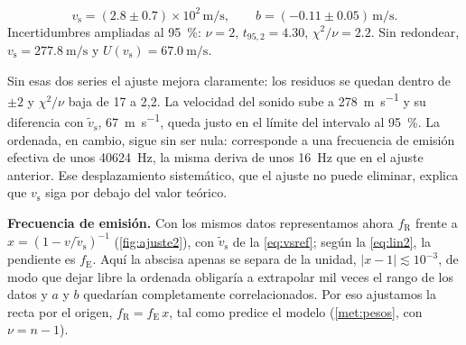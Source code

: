 \documentclass[a4paper,11pt]{amsart}
\numberwithin{equation}{section}
\newcommand{\vs}{v_{\mathrm{s}}}              %
\newcommand{\vst}{\tilde{v}_{\mathrm{s}}}     %
\newcommand{\fE}{f_{\mathrm{E}}}              %
\newcommand{\fR}{f_{\mathrm{R}}}              %
\newcommand{\ext}[1]{U(#1)}                   %
\theoremstyle{cienplano}
\theoremstyle{ciendef}
\theoremstyle{cienobs}
\begin{document}
\begin{destacado}
\vspace{-4pt}
\begin{equation}\label{eq:vsajusteb}
  \vs=(\num{2,8}\pm\num{0,7})\times10^{2}\,\si{\meter\per\second},\qquad
  b=(\num{-0,11}\pm\num{0,05})\,\si{\meter\per\second}.
\end{equation}
{\small Incertidumbres ampliadas al \SI{95}{\percent}: $\nu=2$,
$t_{95,2}=\num{4,30}$, $\chi^{2}/\nu=\num{2,2}$. Sin redondear,
$\vs=\SI{277,8}{\meter\per\second}$ y $\ext{\vs}=\SI{67,0}{\meter\per\second}$.}
\end{destacado}
Sin esas dos series el ajuste mejora claramente: los residuos se quedan dentro
de $\pm2$ y $\chi^{2}/\nu$ baja de 17 a 2,2. La velocidad del sonido sube a
\SI{278}{\meter\per\second} y su diferencia con $\vst$, \SI{67}{\meter\per\second},
queda justo en el límite del intervalo al \SI{95}{\percent}. La ordenada, en
cambio, sigue sin ser nula: corresponde a una frecuencia de emisión efectiva de
unos \SI{40624}{\hertz}, la misma deriva de unos \SI{16}{\hertz} que en el
ajuste anterior. Ese desplazamiento sistemático, que el ajuste no puede
eliminar, explica que $\vs$ siga por debajo del valor teórico.

\medskip
\textbf{Frecuencia de emisión.} Con los mismos datos representamos ahora $\fR$
frente a $x=(1-v/\vst)^{-1}$ (\cref{fig:ajuste2}), con $\vst$ de la
\cref{eq:vsref}; según la \cref{eq:lin2}, la pendiente es $\fE$. Aquí la abscisa
apenas se separa de la unidad, $|x-1|\lesssim10^{-3}$, de modo que dejar libre la
ordenada obligaría a extrapolar mil veces el rango de los datos y $a$ y $b$
quedarían completamente correlacionados. Por eso ajustamos la recta por el origen,
$\fR=\fE\,x$, tal como predice el modelo (\cref{met:pesos}, con $\nu=n-1$).
\end{document}
